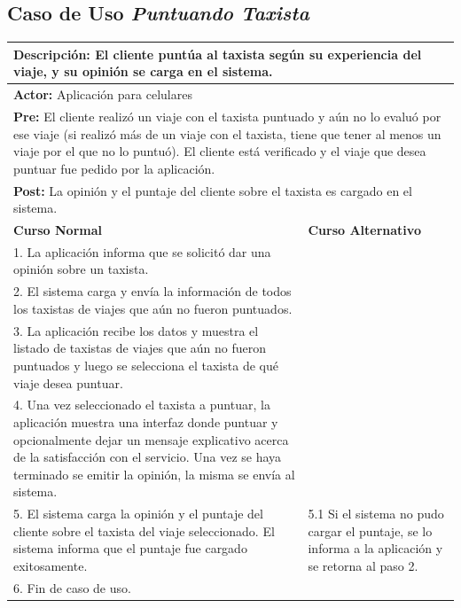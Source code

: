 \documentclass[a4paper]{article}
\begin{document}
\subsection{Caso de Uso \textit{Puntuando Taxista}}
\begin{center}
\begin{tabular}{|p{10cm} | p{6cm}|}
\hline
\multicolumn{2}{|p{16cm}|}{\textbf{Descripci\'on:} El cliente punt\'ua al taxista seg\'un su experiencia del viaje, y su opini\'on se carga en el sistema.} \\
\hline
\multicolumn{2}{|l|}{\textbf{Actor:} Aplicaci\'on para celulares } \\
\hline
\multicolumn{2}{|p{15.5cm}|}{\textbf{Pre:} El cliente realiz\'o un viaje con el taxista puntuado y a\'un no lo evalu\'o por ese viaje (si realiz\'o m\'as de un viaje con el taxista, tiene que tener al menos un viaje por el que no lo puntu\'o). El cliente est\'a verificado y el viaje que desea puntuar fue pedido por la aplicaci\'on.} \\
\hline
\multicolumn{2}{|p{14cm}|}{\textbf{Post:} La opini\'on y el puntaje del cliente sobre el taxista es cargado en el sistema. }\\
\hline
\textbf{Curso Normal}  & \textbf{Curso Alternativo} \\ \hline
1. La aplicaci\'on informa que se solicit\'o dar una opini\'on sobre un taxista. & \\ \hline
2. El sistema carga y env\'ia la informaci\'on de todos los taxistas de viajes que a\'un no fueron puntuados. & \\ \hline
3. La aplicaci\'on recibe los datos y muestra el listado de taxistas de viajes que a\'un no fueron puntuados y luego se selecciona el taxista de qu\'e viaje desea puntuar.  & \\ \hline
4. Una vez seleccionado el taxista a puntuar, la aplicaci\'on muestra una interfaz donde puntuar y opcionalmente dejar un mensaje explicativo acerca de la satisfacci\'on con el servicio. Una vez se haya terminado se emitir la opini\'on, la misma se env\'ia al sistema. & \\ \hline
5. El sistema carga la opini\'on y el puntaje del cliente sobre el taxista del viaje seleccionado. El sistema informa que el puntaje fue cargado exitosamente. & 5.1 Si el sistema no pudo cargar el puntaje, se lo informa a la aplicaci\'on y se retorna al paso 2.\\ \hline
6. Fin de caso de uso. & \\ \hline


\end{tabular}
\end{center}
\end{document}
